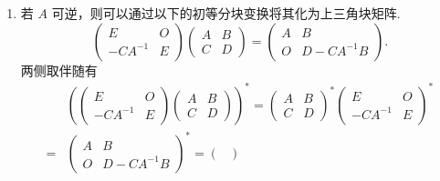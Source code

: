 \begin{enumerate}
\begin{enumerate}
              \item 若 $A$ 可逆，则可以通过以下的初等分块变换将其化为上三角块矩阵.
                    \[\begin{pmatrix}
                            E        & O \\
                            -CA^{-1} & E
                        \end{pmatrix} \begin{pmatrix}
                            A & B \\
                            C & D
                        \end{pmatrix} = \begin{pmatrix}
                            A & B          \\
                            O & D-CA^{-1}B
                        \end{pmatrix}.\]
                    两侧取伴随有
                    \begin{align*}
                            & \left(\begin{pmatrix}
                                        E        & O \\
                                        -CA^{-1} & E
                                    \end{pmatrix}
                        \begin{pmatrix}
                            A & B \\
                            C & D
                        \end{pmatrix}\right)^*
                        = \begin{pmatrix}
                              A & B \\
                              C & D
                          \end{pmatrix}^*
                        \begin{pmatrix}
                            E        & O \\
                            -CA^{-1} & E
                        \end{pmatrix}^*            \\
                        ={} & \begin{pmatrix}
                                  A & B          \\
                                  O & D-CA^{-1}B
                              \end{pmatrix}^*
                        = \begin{pmatrix}

\end{pmatrix}
\end{align*}
\end{enumerate}
\end{enumerate}
